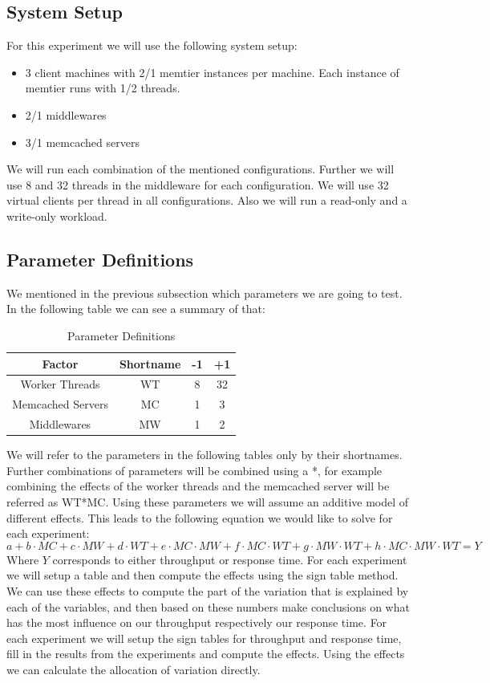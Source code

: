 \documentclass[11pt,a4paper]{article}
\begin{document}
\subsection{System Setup}
%
For this experiment we will use the following system setup:
%
\begin{itemize}
	\item 3 client machines with 2/1 memtier instances per machine. Each instance of memtier runs with 1/2 threads.
	\item 2/1 middlewares
	\item 3/1 memcached servers
\end{itemize}
%
We will run each combination of the mentioned configurations.
%
Further we will use 8 and 32 threads in the middleware for each configuration.
%
We will use 32 virtual clients per thread in all configurations.
%
Also we will run a read-only and a write-only workload.
%
\subsection{Parameter Definitions}
%
We mentioned in the previous subsection which parameters we are going to test.
%
In the following table we can see a summary of that:
%
\begin{table}[H]
\centering
\begin{tabular}{|c|c|c|c|}
\hline Factor & Shortname & -1 & +1\\
\hline
\hline Worker Threads & WT & 8 & 32\\
\hline Memcached Servers & MC & 1 & 3 \\
\hline Middlewares & MW & 1 & 2\\
\hline
\end{tabular}
\caption{Parameter Definitions}
\end{table}
%
We will refer to the parameters in the following tables only by their shortnames.
%
Further combinations of parameters will be combined using a *, for example combining the effects of the worker threads and the memcached server will be referred as WT*MC.
%
Using these parameters we will assume an additive model of different effects.
%
This leads to the following equation we would like to solve for each experiment:
\[
a + b \cdot MC + c \cdot MW + d \cdot WT + e \cdot MC \cdot MW + f \cdot MC \cdot WT + g \cdot MW \cdot WT + h \cdot MC \cdot MW \cdot WT = Y
\]
%
Where $Y$ corresponds to either throughput or response time.
%
For each experiment we will setup a table and then compute the effects using the sign table method.
%
We can use these effects to compute the part of the variation that is explained by each of the variables, and then based on these numbers make conclusions on what has the most influence on our throughput respectively our response time.
%
For each experiment we will setup the sign tables for throughput and response time, fill in the results from the experiments and compute the effects.
%
Using the effects we can calculate the allocation of variation directly.
%
\end{document}
